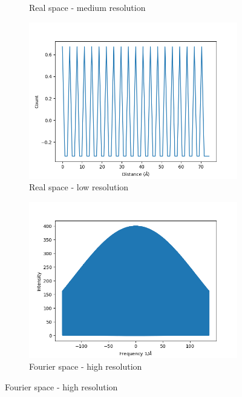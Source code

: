 \documentclass{article}
\begin{document}
\begin{figure}[h]
\begin{subfigure}{0.33\textwidth}
                \caption{Real space - medium resolution}\label{fig:real_delta_1d_medres}
        \end{subfigure}
	\begin{subfigure}{0.33\textwidth}
                \centering
                \includegraphics[width=\textwidth]{real_delta_1d_lowres.png}
                \caption{Real space - low resolution}\label{fig:real_delta_1d_lowres}
	\end{subfigure}
        \begin{subfigure}{0.33\textwidth}
                \centering
                \includegraphics[width=\textwidth]{fourier_delta_1d_highres.png}
                \caption{Fourier space - high resolution}\label{fourier_delta_1d_highres}

\end{subfigure}
\end{figure}
\end{document}
